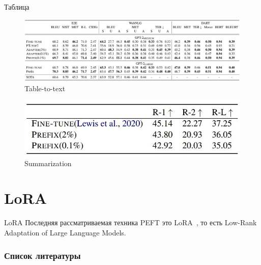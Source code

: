 \documentclass[9pt]{beamer}
\begin{document}
\begin{frame}{Таблица}

    \begin{figure}
        \label{prefix:table-to-text}
        \caption{Table-to-text}
        \begin{center}
            \includegraphics[scale=0.27]{images/prefix_2.jpg}
        \end{center}
    \end{figure}

    \begin{figure}
        \label{prefix:summarization}
        \caption{Summarization}
        \begin{center}
            \includegraphics[scale=0.3]{images/prefix_3.jpg}
        \end{center}
    \end{figure}

\end{frame}

\section{LoRA}

\begin{frame}{LoRA}
    Последняя рассматриваемая техника PEFT это LoRA~\cite{lora}, то есть Low-Rank Adaptation of Large Language Models.
\end{frame}


\begin{frame}[allowframebreaks]
    \frametitle{Список литературы}
    \printbibliography
\end{frame}
\end{document}

